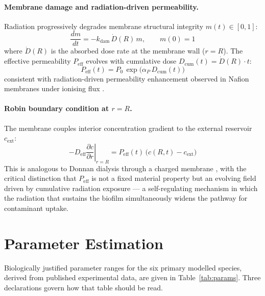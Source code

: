 \documentclass[11pt]{article}
\begin{document}
\paragraph{Membrane damage and radiation-driven permeability.}
Radiation progressively degrades membrane structural integrity $m(t) \in [0,1]$:
\begin{equation}
\frac{dm}{dt} = -k_{\mathrm{dam}}\,\dot{D}(R)\,m, \qquad m(0)=1
\label{eq:membrane_damage}
\end{equation}
where $\dot{D}(R)$ is the absorbed dose rate at the membrane wall ($r=R$).
The effective permeability $P_{\mathrm{eff}}$ evolves with cumulative dose
$D_{\mathrm{cum}}(t) = \dot{D}(R)\cdot t$:
\begin{equation}
P_{\mathrm{eff}}(t) = P_0\,\exp\!\bigl(\alpha_P\,D_{\mathrm{cum}}(t)\bigr)
\label{eq:peff}
\end{equation}
consistent with radiation-driven permeability enhancement observed in Nafion membranes under
ionising flux \cite{lara2023}.

\paragraph{Robin boundary condition at $r = R$.}
The membrane couples interior concentration gradient to the external reservoir $c_{\mathrm{ext}}$:
\begin{equation}
-D_{\mathrm{eff}}\left.\frac{\partial c}{\partial r}\right|_{r=R}
  = P_{\mathrm{eff}}(t)\,\bigl(c(R,t) - c_{\mathrm{ext}}\bigr)
\label{eq:robin}
\end{equation}
This is analogous to Donnan dialysis through a charged membrane \cite{aydogan2022,fox2009},
with the critical distinction that $P_{\mathrm{eff}}$ is not a fixed material property but an
evolving field driven by cumulative radiation exposure --- a self-regulating mechanism in which
the radiation that sustains the biofilm simultaneously widens the pathway for contaminant
uptake.

\section{Parameter Estimation}

Biologically justified parameter ranges for the six primary modelled species, derived from
published experimental data, are given in Table~\ref{tab:params}. Three declarations govern how
that table should be read.
\end{document}
